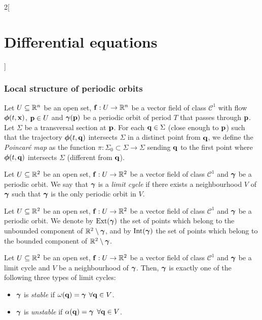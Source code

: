 \documentclass[../../../main.tex]{subfiles}
\begin{document}
\begin{multicols}{2}[\section{Differential equations}]
  \subsubsection{Local structure of periodic orbits}
  \begin{definition}
    Let $U\subseteq \mathbb{R}^n$ be an open set, $\boldsymbol{\mathrm{f}}:U\rightarrow\mathbb{R}^n$ be a vector field of class $\mathcal{C}^1$ with flow $\boldsymbol{\mathrm{\phi}}(t,\boldsymbol{\mathrm{x}})$, $\boldsymbol{\mathrm{p}}\in U$ and $\boldsymbol{\mathrm{\gamma}}(\boldsymbol{\mathrm{p}})$ be a periodic orbit of period $T$ that passes through $\boldsymbol{\mathrm{p}}$. Let $\Sigma$ be a transversal section at $\boldsymbol{\mathrm{p}}$. For each $\boldsymbol{\mathrm{q}}\in\Sigma$ (close enough to $\boldsymbol{\mathrm{p}}$) such that the trajectory $\boldsymbol{\mathrm{\phi}}(t,\boldsymbol{\mathrm{q}})$ intersects $\Sigma$ in a distinct point from $\boldsymbol{\mathrm{q}}$, we define the \emph{Poincaré map} as the function $\pi:\Sigma_0\subset \Sigma\rightarrow\Sigma$ sending $\boldsymbol{\mathrm{q}}$ to the first point where $\boldsymbol{\mathrm{\phi}}(t,\boldsymbol{\mathrm{q}})$ intersects $\Sigma$ (different from $\boldsymbol{\mathrm{q}}$).
  \end{definition}
  \begin{definition}
    Let $U\subseteq \mathbb{R}^2$ be an open set, $\boldsymbol{\mathrm{f}}:U\rightarrow\mathbb{R}^2$ be a vector field of class $\mathcal{C}^1$ and $\boldsymbol{\mathrm{\gamma}}$ be a periodic orbit. We say that $\boldsymbol{\mathrm{\gamma}}$ is a \emph{limit cycle} if there exists a neighbourhood $V$ of $\boldsymbol{\mathrm{\gamma}}$ such that $\boldsymbol{\mathrm{\gamma}}$ is the only periodic orbit in $V$.
  \end{definition}
  \begin{definition}
    Let $U\subseteq \mathbb{R}^2$ be an open set, $\boldsymbol{\mathrm{f}}:U\rightarrow\mathbb{R}^2$ be a vector field of class $\mathcal{C}^1$ and $\boldsymbol{\mathrm{\gamma}}$ be a periodic orbit. We denote by $\operatorname{Ext}(\boldsymbol{\mathrm{\gamma}})$ the set of points which belong to the unbounded component of $\mathbb{R}^2\setminus\boldsymbol{\mathrm{\gamma}}$, and by $\operatorname{Int}(\boldsymbol{\mathrm{\gamma}})$ the set of points which belong to the bounded component of $\mathbb{R}^2\setminus\boldsymbol{\mathrm{\gamma}}$.
  \end{definition}
  \begin{proposition}
    Let $U\subseteq \mathbb{R}^2$ be an open set, $\boldsymbol{\mathrm{f}}:U\rightarrow\mathbb{R}^2$ be a vector field of class $\mathcal{C}^1$ and $\boldsymbol{\mathrm{\gamma}}$ be a limit cycle and $V$ be a neighbourhood of $\boldsymbol{\mathrm{\gamma}}$. Then, $\boldsymbol{\mathrm{\gamma}}$ is exactly one of the following three types of limit cycles:
    \begin{itemize}
      \item $\boldsymbol{\mathrm{\gamma}}$ is \emph{stable} if $\omega(\boldsymbol{\mathrm{q}})=\boldsymbol{\mathrm{\gamma}}$ $\forall \boldsymbol{\mathrm{q}}\in V$.
      \item $\boldsymbol{\mathrm{\gamma}}$ is \emph{unstable} if $\alpha(\boldsymbol{\mathrm{q}})=\boldsymbol{\mathrm{\gamma}}$ $\forall \boldsymbol{\mathrm{q}}\in V$.

\end{itemize}
\end{proposition}
\end{multicols}
\end{document}

